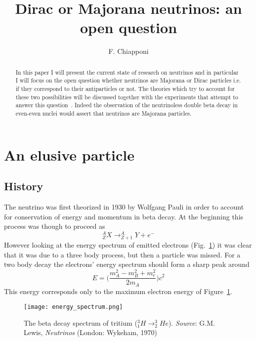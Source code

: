 \documentclass{subnucbo}
\begin{document}
\title{Dirac or Majorana neutrinos: an open question}

\author{F. Chiapponi} 



\maketitle

\begin{abstract}
In this paper I will present the current state of research on neutrinos and in particular I will focus on the open question whether neutrinos are Majorana or Dirac particles i.e. if they correspond to their antiparticles or not. The theories which try to account for these two possibilities will be discussed together with the experiments that attempt to answer this question~\cite{ref:exo,ref:cupid}. Indeed the observation of the neutrinoless double beta decay in even-even nuclei would assert that neutrinos are Majorana particles. 
\end{abstract}

\section{An elusive particle}
\subsection{History}
The neutrino was first theorized in 1930 by Wolfgang Pauli in order to account for conservation of energy and momentum in beta decay.
At the beginning this process was though to proceed as
\[
^A_Z X\rightarrow ^A_{Z+1}Y+e^-
\]
However looking at the energy spectrum of emitted electrons (Fig.~\ref{fig:betaD}) it was clear that it was due to a three body process, but then a particle was missed. For a two body decay the electrons' energy spectrum should form a sharp peak around 
\begin{equation}
E=\biggl(\frac{m^2_A-m^2_B+m^2_e}{2m_A}\biggr)c^2
\label{eq:Emax}
\end{equation}
This energy corresponds only to the maximum electron energy of Figure~\ref{fig:betaD}.

\begin{figure}[h]
\centering
\texttt{[image: energy\_spectrum.png]}
\caption{The beta decay spectrum of tritium ($^3_1H\rightarrow ^3_2He$). \emph{Source}: G.M. Lewis, \emph{Neutrinos} (London: Wykeham, 1970)}
\label{fig:betaD}
\end{figure}
\end{document}
